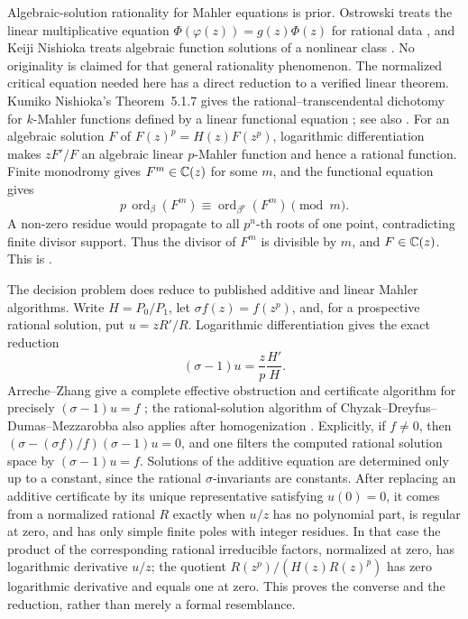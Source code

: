 Algebraic-solution rationality for Mahler equations is prior.  Ostrowski
treats the linear multiplicative equation
\(\Phi(\varphi(z))=g(z)\Phi(z)\) for rational data
\cite{Ostrowski1968AlgebraicSolutions}, and Keiji Nishioka treats algebraic
function solutions of a nonlinear class
\cite{Nishioka1985AlgebraicSolutions}.  No originality is claimed for that
general rationality phenomenon.  The normalized critical equation needed
here has a direct reduction to a verified linear theorem.  Kumiko Nishioka's
Theorem~5.1.7 gives the rational--transcendental dichotomy for \(k\)-Mahler
functions defined by a linear functional equation
\cite[Theorem~5.1.7]{Nishioka1996MahlerFunctions}; see also
\cite[Corollary~8]{BellCoonsRowland2013MahlerDichotomy}.  For an algebraic
solution \(F\) of \(F(z)^p=H(z)F(z^p)\), logarithmic differentiation makes
\(zF'/F\) an algebraic linear \(p\)-Mahler function and hence a rational
function.  Finite monodromy gives \(F^m\in\mathbb{C}(z)\) for some \(m\), and the
functional equation gives
\[
 p\,\operatorname{ord}_\beta(F^m)
 \equiv\operatorname{ord}_{\beta^p}(F^m)\pmod m.
\]
A non-zero residue would propagate to all \(p^n\)-th roots of one point,
contradicting finite divisor support.  Thus the divisor of \(F^m\) is
divisible by \(m\), and \(F\in\mathbb{C}(z)\).  This is
.

The decision problem does reduce to published additive and linear Mahler
algorithms.  Write \(H=P_0/P_1\), let \(\sigma f(z)=f(z^p)\), and, for a
prospective rational solution, put \(u=zR'/R\).  Logarithmic differentiation
gives the exact reduction
\begin{equation}\label{eq:intro-logarithmic-derivative-reduction}
 (\sigma-1)u=\frac{z}{p}\frac{H'}H.
\end{equation}
Arreche--Zhang give a complete effective obstruction and certificate
algorithm for precisely \((\sigma-1)u=f\)
\cite{ArrecheZhang2022MahlerResidues}; the rational-solution algorithm of
Chyzak--Dreyfus--Dumas--Mezzarobba also applies after homogenization
\cite{ChyzakDreyfusDumasMezzarobba2018MahlerSolutions}.  Explicitly, if
\(f\ne0\), then
\((\sigma-(\sigma f)/f)(\sigma-1)u=0\), and one filters the computed rational
solution space by \((\sigma-1)u=f\).  Solutions of the additive equation are
determined only up to a constant, since the rational \(\sigma\)-invariants are
constants.  After replacing an additive certificate by its unique
representative satisfying \(u(0)=0\), it comes from a normalized rational
\(R\) exactly when \(u/z\) has no polynomial part, is regular at zero, and
has only simple finite poles with integer residues.  In that case the
product of the corresponding rational irreducible factors, normalized at
zero, has logarithmic derivative \(u/z\); the quotient
\(R(z^p)/(H(z)R(z)^p)\) has zero logarithmic derivative and equals one at
zero.  This proves the converse and the reduction, rather than merely a
formal resemblance.

